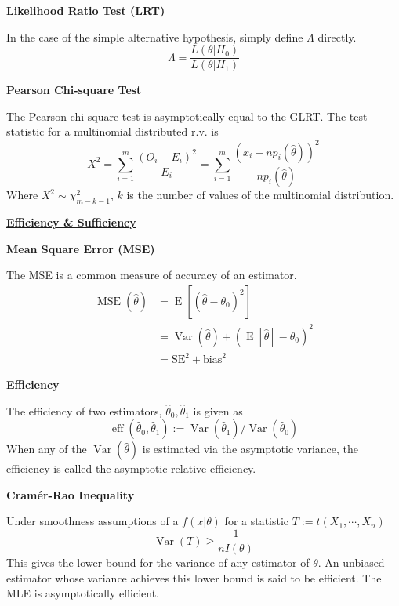 \documentclass[a4paper]{article}
\newcommand{\heading}[1]{{\small\underline{\textbf{#1}}}\smallskip}
\newcommand{\subheading}[1]{{\scriptsize\textbf{#1}}}
\renewenvironment{section}[1]
  {
    \subheading{#1}

  }{
    \smallskip
  }
\newcommand{\expectation}[1]{\operatorname{E}[#1]}
\DeclareMathOperator{\Var}{Var}
\DeclareMathOperator{\MSE}{MSE}
\DeclareMathOperator{\eff}{eff}
\begin{document}
\begin{multicols*}{4}
\begin{section}{Likelihood Ratio Test (LRT)}
  In the case of the simple alternative hypothesis, simply define $\Lambda$
  directly.
  $$\Lambda = \frac{
    L(\theta | H_0)
  }{
    L(\theta | H_1)
  }$$
\end{section}

\begin{section}{Pearson Chi-square Test}
  The Pearson chi-square test is asymptotically equal to the GLRT. The test
  statistic for a multinomial distributed r.v. is
  $$X^2 = \sum^m_{i=1}\frac{(O_i - E_i)^2}{E_i}
    = \sum^m_{i=1} \frac{(x_i - np_i(\hat{\theta}))^2}{np_i(\hat{\theta})}$$
  Where $X^2 \sim \chi^2_{m-k-1}$, $k$ is the number of values of the
  multinomial distribution.
\end{section}

\heading{Efficiency \& Sufficiency}

\begin{section}{Mean Square Error (MSE)}
  The MSE is a common measure of accuracy of an estimator.
  \begin{align*}
    \MSE(\hat{\theta}) &= \expectation{(\hat{\theta}-\theta_0)^2} \\
                       &= \Var(\hat{\theta}) +
                          (\expectation{\hat{\theta}} - \theta_0)^2 \\
                       &= \text{SE}^2 + \text{bias}^2
  \end{align*}
\end{section}

\begin{section}{Efficiency}
  The efficiency of two estimators, $\hat{\theta}_0, \hat{\theta}_1$ is given as
  $$\eff(\hat{\theta}_0, \hat{\theta}_1) :=
    \Var(\hat{\theta}_1)/\Var(\hat{\theta}_0)$$
  When any of the $\Var(\hat{\theta})$ is estimated via the asymptotic variance,
  the efficiency is called the asymptotic relative efficiency.
\end{section}

\begin{section}{Cram\'er-Rao Inequality}
  Under smoothness assumptions of a $f(x|\theta)$ for a statistic $T:=t(X_1,
  \cdots, X_n)$
  $$\Var(T) \geq \frac{1}{nI(\theta)}$$
  This gives the lower bound for the variance of any estimator of $\theta$. An
  unbiased estimator whose variance achieves this lower bound is said to be
  efficient. The MLE is asymptotically efficient.
\end{section}


\end{multicols*}
\end{document}
